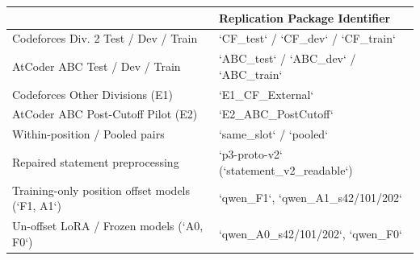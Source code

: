 \begin{tabularx}{\linewidth}{@{}>{\raggedright\arraybackslash}X>{\raggedright\arraybackslash}X@{}}
\toprule
{Manuscript Term} & {Replication Package Identifier} \\
\midrule
Codeforces Div. 2 Test / Dev / Train & `CF\_test` / `CF\_dev` / `CF\_train` \\
AtCoder ABC Test / Dev / Train & `ABC\_test` / `ABC\_dev` / `ABC\_train` \\
Codeforces Other Divisions (E1) & `E1\_CF\_External` \\
AtCoder ABC Post-Cutoff Pilot (E2) & `E2\_ABC\_PostCutoff` \\
Within-position / Pooled pairs & `same\_slot` / `pooled` \\
Repaired statement preprocessing & `p3-proto-v2` (`statement\_v2\_readable`) \\
Training-only position offset models (`F1, A1`) & `qwen\_F1`, `qwen\_A1\_s42/101/202` \\
Un-offset LoRA / Frozen models (`A0, F0`) & `qwen\_A0\_s42/101/202`, `qwen\_F0` \\
\bottomrule
\end{tabularx}
